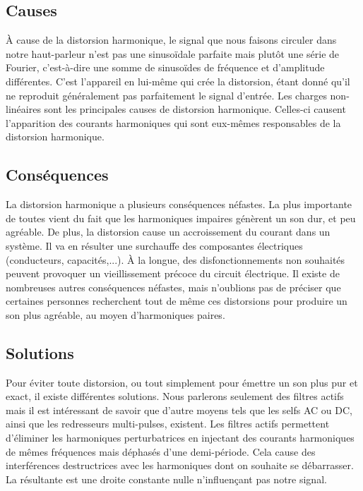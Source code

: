 \subsection{Causes}
À cause de la distorsion harmonique, le signal que nous faisons circuler dans notre haut-parleur n'est pas
une sinusoïdale parfaite mais plutôt une série de Fourier, c'est-à-dire une somme de sinusoïdes de 
fréquence et d'amplitude différentes. C'est l'appareil en lui-même qui crée la distorsion, étant donné 
qu'il ne reproduit généralement pas parfaitement le signal d'entrée. 
Les charges non-linéaires sont les principales causes de distorsion harmonique. Celles-ci causent 
l'apparition des courants harmoniques qui sont eux-mêmes responsables de la distorsion harmonique.

\subsection{Conséquences}
La distorsion harmonique a plusieurs conséquences néfastes.
La plus importante de toutes vient du fait que les harmoniques impaires génèrent un son dur, et peu agréable. De plus, la distorsion cause un accroissement 
du courant dans un système. Il va en résulter une surchauffe des composantes électriques (conducteurs, 
capacités,...). À la longue, des disfonctionnements non souhaités peuvent provoquer un vieillissement 
précoce du circuit électrique. Il existe de nombreuses autres conséquences néfastes, mais n'oublions pas de préciser que certaines personnes recherchent tout de même ces distorsions pour produire un son plus agréable, au moyen d'harmoniques paires.

\subsection{Solutions}
Pour éviter toute distorsion, ou tout simplement pour émettre un son plus pur et exact, 
il existe différentes solutions. Nous parlerons seulement des filtres actifs 
mais il est intéressant de savoir que d'autre moyens tels que les selfs AC ou DC, ainsi que les redresseurs
multi-pulses, existent. 
Les filtres actifs permettent d'éliminer les harmoniques perturbatrices en injectant des courants
harmoniques de mêmes fréquences mais déphasés d'une demi-période. Cela cause des interférences
destructrices avec les harmoniques dont on souhaite se débarrasser. La résultante est une droite constante
nulle n'influençant pas notre signal.


\clearpage

